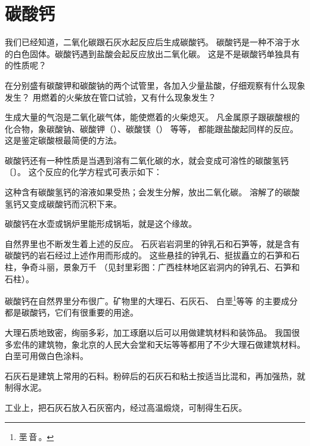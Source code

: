 \section{碳酸钙}\label{sec:3-6}

我们已经知道，二氧化碳跟石灰水起反应后生成碳酸钙。
碳酸钙是一种不溶于水的白色固体。碳酸钙遇到盐酸会起反应放出二氧化碳。
这是不是碳酸钙单独具有的性质呢？

\begin{shiyan}
    在分别盛有碳酸钾和碳酸钠的两个试管里，各加入少量盐酸，仔细观察有什么现象发生？
    用燃着的火柴放在管口试验，又有什么现象发生？
\end{shiyan}

生成大量的气泡是二氧化碳气体，能使燃着的火柴熄灭。
凡金属原子跟碳酸根的化合物，象碳酸钠、碳酸钾（）、碳酸镁（） 等等，
都能跟盐酸起同样的反应。这是鉴定碳酸根最简便的方法。

碳酸钙还有一种性质是当遇到溶有二氧化碳的水，就会变成可溶性的碳酸氢钙〔〕。
这个反应的化学方程式可表示如下：
\begin{fangchengshi}
\end{fangchengshi}

这种含有碳酸氢钙的溶液如果受热；会发生分解，放出二氧化碳。
溶解了的碳酸氢钙又变成碳酸钙而沉积下来。
\begin{fangchengshi}
\end{fangchengshi}

碳酸钙在水壶或锅炉里能形成锅垢，就是这个缘故。

自然界里也不断发生着上述的反应。
石灰岩岩洞里的钟乳石和石笋等，就是含有碳酸钙的岩石经过上述作用而形成的。
这些悬挂的钟乳石、挺拔矗立的石笋和石柱，争奇斗丽，景象万千
（见封里彩图：广西桂林地区岩洞内的钟乳石、石笋和石柱）。

碳酸钙在自然界里分布很广。矿物里的大理石、石灰石、
白垩\footnote{垩\,音\,。}等等
的主要成分都是碳酸钙，它们有很重要的用途。

大理石质地致密，绚丽多彩，加工琢磨以后可以用做建筑材料和装饰品。
我国很多宏伟的建筑物，象北京的人民大会堂和天坛等等都用了不少大理石做建筑材料。
白垩可用做白色涂料。

石灰石是建筑上常用的石料。粉碎后的石灰石和粘土按适当比混和，再加强热，就制得水泥。

工业上，把石灰石放入石灰窑内，经过高温煅烧，可制得生石灰。


